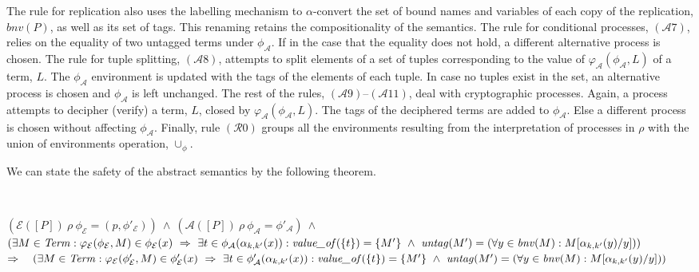 \documentclass{entcs} \usepackage{entcsmacro}
\begin{document}
\noindent
The rule for replication also uses the labelling mechanism to $\alpha$-convert the set of bound names and variables of each copy of the replication, $bnv(P)$, as well as its set of tags.  This renaming retains the compositionality of the semantics.  The rule for conditional processes, $(\mathcal{A}7)$, relies on the equality of two untagged terms under $\phi_\mathcal{A}$. If in the case that the equality does not hold, a different alternative process is chosen.  The rule for tuple splitting, $(\mathcal{A}8)$, attempts to split elements of a set of tuples corresponding to the value of $\varphi_\mathcal{A}(\phi_\mathcal{A},L)$ of a term, $L$.  The $\phi_\mathcal{A}$ environment is updated with the tags of the elements of each tuple. In case no tuples exist in the set, an alternative process is chosen and $\phi_\mathcal{A}$ is left unchanged.  The rest of the rules, $(\mathcal{A}9)$--$(\mathcal{A}11)$, deal with cryptographic processes.  Again, a process attempts to decipher (verify) a term, $L$, closed by $\varphi_\mathcal{A}(\phi_\mathcal{A},L)$. The tags of the deciphered terms are added to $\phi_\mathcal{A}$.  Else a different process is chosen without affecting $\phi_\mathcal{A}$. Finally, rule $(\mathcal{R}0)$ groups all the environments resulting from the interpretation of processes in $\rho$ with the union of environments operation, $\cup_\phi$.

We can state the safety of the abstract semantics by the following theorem.
\begin{theor}\label{theor4}
$ $

\noindent
$(\mathcal{E}(\![P]\!)~\rho~\phi_\mathcal{E}=(p,\phi'_\mathcal{E}))~\wedge~(\mathcal{A}(\![P]\!)~\rho~\phi_\mathcal{A}=\phi'_\mathcal{A})~\wedge$\\
$(\exists M\in\mbox{{\itshape Term\/}}:\varphi_\mathcal{E}(\phi_\mathcal{E},M)\in\phi_\mathcal{E}(x)~\Rightarrow~\exists t\in\phi_\mathcal{A}(\alpha_{k,k'}(x)):\mbox{{\itshape value\_of\/}}(\{t\})=\{M'\}~\wedge~\mbox{{\itshape untag\/}}(M')=(\forall y\in\mbox{{\itshape bnv\/}}(M):M[\alpha_{k,k'}(y)/y]))$\\

\noindent
$\Rightarrow~~~(\exists M\in\mbox{{\itshape Term\/}}:\varphi_\mathcal{E}(\phi'_\mathcal{E},M)\in\phi'_\mathcal{E}(x)~\Rightarrow~\exists t\in\phi'_\mathcal{A}(\alpha_{k,k'}(x)): \mbox{{\itshape value\_of\/}}(\{t\})=\{M'\}~\wedge~\mbox{{\itshape untag\/}}(M')=(\forall y\in\mbox{{\itshape bnv\/}}(M):M[\alpha_{k,k'}(y)/y]))$
\end{theor}
\end{document}
